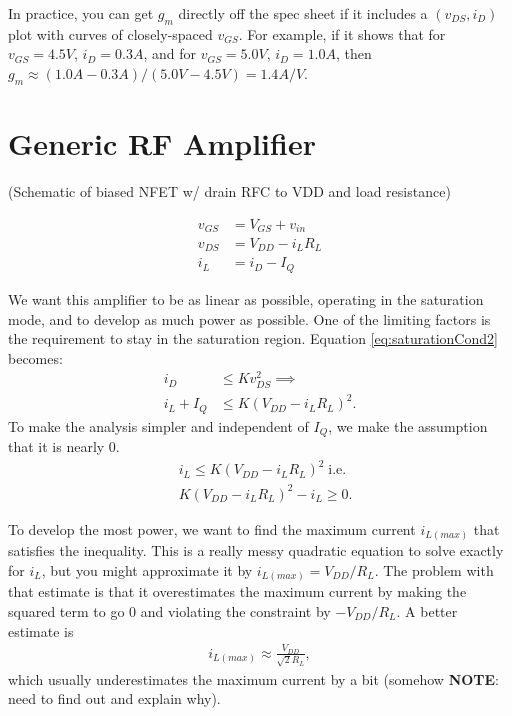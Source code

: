 \documentclass[letterpaper,10pt]{report}
\begin{document}
In practice, you can get $g_m$ directly off the spec sheet if it includes a
$(v_{DS},i_D)$ plot with curves of closely-spaced $v_{GS}$. For example,
if it shows that for $v_{GS}=4.5V$, $i_D=0.3A$, and for $v_{GS}=5.0V$,
$i_D=1.0A$, then $g_m \approx (1.0A-0.3A)/(5.0V-4.5V) = 1.4A/V$.

\chapter{Generic RF Amplifier}%

\noindent (Schematic of biased NFET w/ drain RFC to VDD and load resistance)

\begin{align}
 v_{GS} &= V_{GS} + v_{in} \\
 v_{DS} &= V_{DD} - i_LR_L \\
 i_L &= i_D-I_Q
\end{align}

We want this amplifier to be as linear as possible, operating in the saturation
mode, and to develop as much power as possible. One of the limiting factors
is the requirement to stay in the saturation region. Equation
\eqref{eq:saturationCond2} becomes:
\begin{align}
 i_D &\leq Kv_{DS}^2 \implies \nonumber \\
 i_L + I_Q &\leq K(V_{DD}-i_LR_L)^2. \nonumber
\end{align}
To make the analysis simpler and independent of $I_Q$, we make the assumption
that it is nearly 0.
\begin{align}
 &i_L \leq K(V_{DD}-i_LR_L)^2 \; \text{i.e.} \nonumber \\
 &K(V_{DD}-i_LR_L)^2 - i_L \geq 0.
\end{align}

To develop the most power, we want to find the maximum current $i_{L(max)}$ that
satisfies the inequality. This is a really messy quadratic equation to solve
exactly for $i_L$, but you might approximate it by $i_{L(max)}=V_{DD}/R_L$. The
problem with that estimate is that it overestimates the maximum current by
making the squared term to go 0 and violating the constraint by $-V_{DD}/R_L$.
A better estimate is
\begin{align}
 i_{L(max)} \approx \frac{V_{DD}}{\sqrt{2}R_L},
\end{align}
which usually underestimates the maximum current by a bit (somehow
\textbf{NOTE}: need to find out and explain why).
\end{document}
